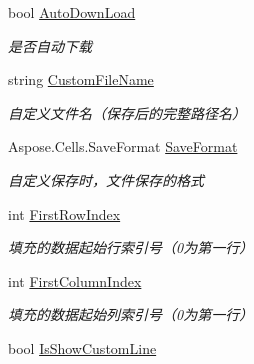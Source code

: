 \begin{DoxyCompactItemize}
bool \hyperlink{class_x_c_l_net_tools_1_1_entity_1_1_office_1_1_excel_handler_1_1_out_put_param_class_a31974296d52728900508e02b4ad040b8}{Auto\-Down\-Load}
\begin{DoxyCompactList}\small\item\em 是否自动下载 \end{DoxyCompactList}\item 
string \hyperlink{class_x_c_l_net_tools_1_1_entity_1_1_office_1_1_excel_handler_1_1_out_put_param_class_a764a7f2a435a3b3ab61c02ff7fc0d942}{Custom\-File\-Name}
\begin{DoxyCompactList}\small\item\em 自定义文件名（保存后的完整路径名） \end{DoxyCompactList}\item 
Aspose.\-Cells.\-Save\-Format \hyperlink{class_x_c_l_net_tools_1_1_entity_1_1_office_1_1_excel_handler_1_1_out_put_param_class_a9ceabce939de783bbe5ee3774183db8e}{Save\-Format}
\begin{DoxyCompactList}\small\item\em 自定义保存时，文件保存的格式 \end{DoxyCompactList}\item 
int \hyperlink{class_x_c_l_net_tools_1_1_entity_1_1_office_1_1_excel_handler_1_1_out_put_param_class_acd2e964c33b831d1cbd69e003ccd0311}{First\-Row\-Index}
\begin{DoxyCompactList}\small\item\em 填充的数据起始行索引号（0为第一行） \end{DoxyCompactList}\item 
int \hyperlink{class_x_c_l_net_tools_1_1_entity_1_1_office_1_1_excel_handler_1_1_out_put_param_class_aac59845922cfe83121fa7ffb39e8564b}{First\-Column\-Index}
\begin{DoxyCompactList}\small\item\em 填充的数据起始列索引号（0为第一行） \end{DoxyCompactList}\item 
bool \hyperlink{class_x_c_l_net_tools_1_1_entity_1_1_office_1_1_excel_handler_1_1_out_put_param_class_a6fca02e4b0654506b9bcc19b690a3ed8}{Is\-Show\-Custom\-Line}

\end{DoxyCompactItemize}
